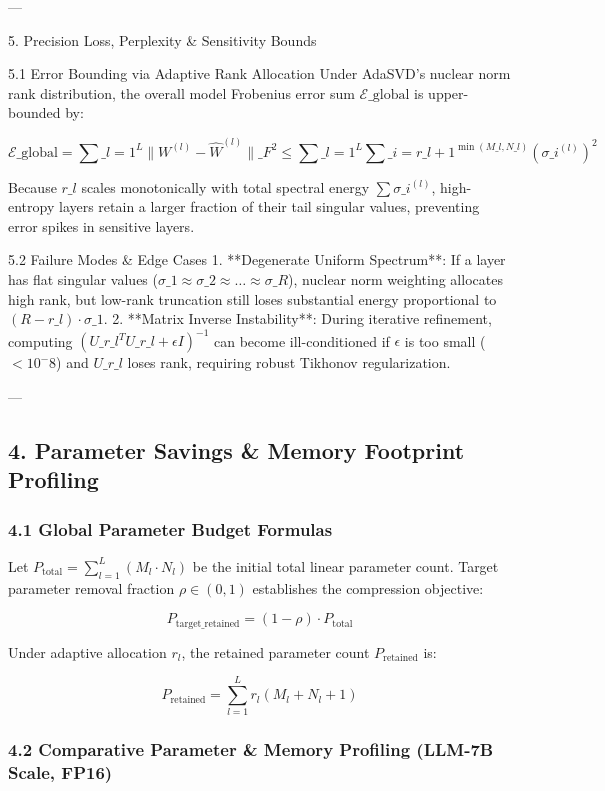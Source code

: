---


 5. Precision Loss, Perplexity \& Sensitivity Bounds


 5.1 Error Bounding via Adaptive Rank Allocation
Under AdaSVD's nuclear norm rank distribution, the overall model Frobenius error sum $\mathcal{E}\_{\text{global}}$ is upper-bounded by:

\[
\mathcal{E}\_{\text{global}} = \sum\_{l=1}^{L} \|W^{(l)} - \hat{W}^{(l)}\|\_F^2 \le \sum\_{l=1}^{L} \sum\_{i=r\_l + 1}^{\min(M\_l, N\_l)} (\sigma\_i^{(l)})^2
\]

Because $r\_l$ scales monotonically with total spectral energy $\sum \sigma\_i^{(l)}$, high-entropy layers retain a larger fraction of their tail singular values, preventing error spikes in sensitive layers.

 5.2 Failure Modes \& Edge Cases
1. **Degenerate Uniform Spectrum**: If a layer has flat singular values ($\sigma\_1 \approx \sigma\_2 \approx \dots \approx \sigma\_R$), nuclear norm weighting allocates high rank, but low-rank truncation still loses substantial energy proportional to $(R - r\_l) \cdot \sigma\_1$.
2. **Matrix Inverse Instability**: During iterative refinement, computing $(U\_{r\_l}^T U\_{r\_l} + \epsilon I)^{-1}$ can become ill-conditioned if $\epsilon$ is too small ($< 10^-8$) and $U\_{r\_l}$ loses rank, requiring robust Tikhonov regularization.

---



\subsection{4. Parameter Savings \& Memory Footprint Profiling}
\subsubsection{4.1 Global Parameter Budget Formulas}
Let $P_{\text{total}} = \sum_{l=1}^L (M_l \cdot N_l)$ be the initial total linear parameter count.
Target parameter removal fraction $\rho \in (0, 1)$ establishes the compression objective:

\[
P_{\text{target\_retained}} = (1 - \rho) \cdot P_{\text{total}}
\]

Under adaptive allocation $r_l$, the retained parameter count $P_{\text{retained}}$ is:

\[
P_{\text{retained}} = \sum_{l=1}^{L} r_l (M_l + N_l + 1)
\]

\subsubsection{4.2 Comparative Parameter \& Memory Profiling (LLM-7B Scale, FP16)}

